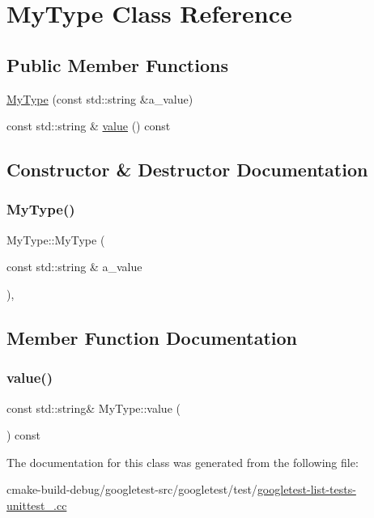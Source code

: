 \hypertarget{classMyType}{}\section{My\+Type Class Reference}
\label{classMyType}
\subsection*{Public Member Functions}
\begin{DoxyCompactItemize}
\item 
\mbox{\hyperlink{classMyType_a74d6f29a06e298321a6e5f0b91b020e7}{My\+Type}} (const std\+::string \&a\+\_\+value)
\item 
const std\+::string \& \mbox{\hyperlink{classMyType_a04eaace57f0ecd8ee8898defbdee31b4}{value}} () const
\end{DoxyCompactItemize}


\subsection{Constructor \& Destructor Documentation}
\mbox{\label{classMyType_a74d6f29a06e298321a6e5f0b91b020e7}} 
\subsubsection{\texorpdfstring{MyType()}{MyType()}}
{\footnotesize\ttfamily My\+Type\+::\+My\+Type (\begin{DoxyParamCaption}\item[{const std\+::string \&}]{a\+\_\+value }\end{DoxyParamCaption})\hspace{0.3cm}{\ttfamily [inline]}, {\ttfamily [explicit]}}



\subsection{Member Function Documentation}
\mbox{\label{classMyType_a04eaace57f0ecd8ee8898defbdee31b4}} 
\subsubsection{\texorpdfstring{value()}{value()}}
{\footnotesize\ttfamily const std\+::string\& My\+Type\+::value (\begin{DoxyParamCaption}{ }\end{DoxyParamCaption}) const\hspace{0.3cm}{\ttfamily [inline]}}



The documentation for this class was generated from the following file\+:\begin{DoxyCompactItemize}
\item 
cmake-\/build-\/debug/googletest-\/src/googletest/test/\mbox{\hyperlink{googletest-list-tests-unittest___8cc}{googletest-\/list-\/tests-\/unittest\+\_\+.\+cc}}\end{DoxyCompactItemize}

